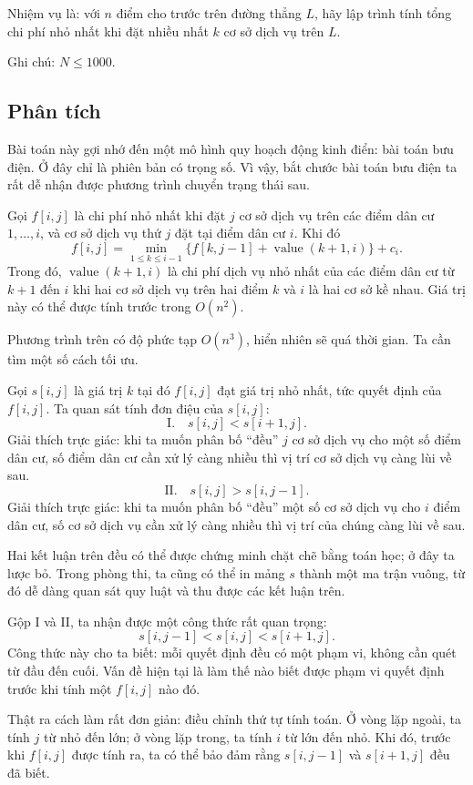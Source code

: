 \documentclass[11pt]{article}
\begin{document}
Nhiệm vụ là: với $n$ điểm cho trước trên đường thẳng $L$, hãy lập trình tính
tổng chi phí nhỏ nhất khi đặt nhiều nhất $k$ cơ sở dịch vụ trên $L$.

Ghi chú: $N\le 1000$.

\subsection*{Phân tích}

Bài toán này gợi nhớ đến một mô hình quy hoạch động kinh điển: bài toán bưu
điện. Ở đây chỉ là phiên bản có trọng số. Vì vậy, bắt chước bài toán bưu điện
ta rất dễ nhận được phương trình chuyển trạng thái sau.

Gọi $f[i,j]$ là chi phí nhỏ nhất khi đặt $j$ cơ sở dịch vụ trên các điểm dân cư
$1,\ldots,i$, và cơ sở dịch vụ thứ $j$ đặt tại điểm dân cư $i$. Khi đó
\[
  f[i,j]=\min_{1\le k\le i-1}
    \{f[k,j-1]+\operatorname{value}(k+1,i)\}+c_i.
\]
Trong đó, $\operatorname{value}(k+1,i)$ là chi phí dịch vụ nhỏ nhất của các
điểm dân cư từ $k+1$ đến $i$ khi hai cơ sở dịch vụ trên hai điểm $k$ và $i$ là
hai cơ sở kề nhau. Giá trị này có thể được tính trước trong $O(n^2)$.

Phương trình trên có độ phức tạp $O(n^3)$, hiển nhiên sẽ quá thời gian. Ta cần
tìm một số cách tối ưu.

Gọi $s[i,j]$ là giá trị $k$ tại đó $f[i,j]$ đạt giá trị nhỏ nhất, tức quyết
định của $f[i,j]$. Ta quan sát tính đơn điệu của $s[i,j]$:
\[
  \text{I.}\quad s[i,j] < s[i+1,j].
\]
Giải thích trực giác: khi ta muốn phân bố ``đều'' $j$ cơ sở dịch vụ cho một
số điểm dân cư, số điểm dân cư cần xử lý càng nhiều thì vị trí cơ sở dịch vụ
càng lùi về sau.
\[
  \text{II.}\quad s[i,j] > s[i,j-1].
\]
Giải thích trực giác: khi ta muốn phân bố ``đều'' một số cơ sở dịch vụ cho
$i$ điểm dân cư, số cơ sở dịch vụ cần xử lý càng nhiều thì vị trí của chúng
càng lùi về sau.

Hai kết luận trên đều có thể được chứng minh chặt chẽ bằng toán học; ở đây ta
lược bỏ. Trong phòng thi, ta cũng có thể in mảng $s$ thành một ma trận vuông,
từ đó dễ dàng quan sát quy luật và thu được các kết luận trên.

Gộp I và II, ta nhận được một công thức rất quan trọng:
\[
  s[i,j-1] < s[i,j] < s[i+1,j].
\]
Công thức này cho ta biết: mỗi quyết định đều có một phạm vi, không cần quét
từ đầu đến cuối. Vấn đề hiện tại là làm thế nào biết được phạm vi quyết định
trước khi tính một $f[i,j]$ nào đó.

Thật ra cách làm rất đơn giản: điều chỉnh thứ tự tính toán. Ở vòng lặp ngoài,
ta tính $j$ từ nhỏ đến lớn; ở vòng lặp trong, ta tính $i$ từ lớn đến nhỏ. Khi
đó, trước khi $f[i,j]$ được tính ra, ta có thể bảo đảm rằng $s[i,j-1]$ và
$s[i+1,j]$ đều đã biết.
\end{document}
